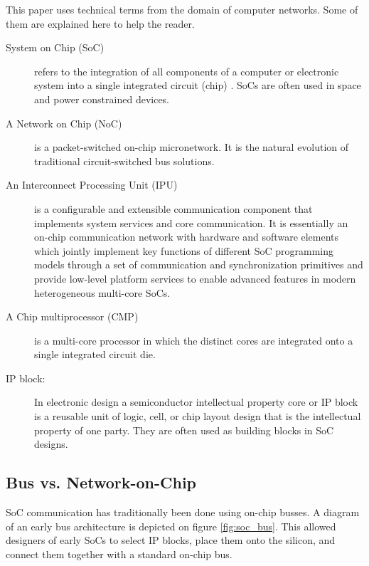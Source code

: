 This paper uses technical terms from the domain of computer networks. 
Some of them are explained here to help the reader.

\begin{description}

\item[System on Chip (SoC)] 
	
refers to the integration of all components of a computer or electronic system into a single integrated circuit (chip) \cite{wikiSoC}. SoCs are often used in space and power constrained devices.
	
\item[A Network on Chip (NoC)] 

is a packet-switched on-chip micronetwork. 
It is the natural evolution of traditional circuit-switched bus solutions. 
	
\item[An Interconnect Processing Unit (IPU)] 
	
is a configurable and extensible communication component that implements system services and core communication. 
It is essentially an on-chip communication network with hardware and software elements which jointly implement key functions of different SoC programming models through a set of communication and synchronization primitives and provide low-level platform services to enable advanced features in modern heterogeneous multi-core SoCs.\cite{coppola2008design}

\item[A Chip multiprocessor (CMP)] 

is a multi-core processor in which the distinct cores are integrated onto a single integrated circuit die.

\item[IP block:] 
	
In electronic design a semiconductor intellectual property core or IP block is a reusable unit of logic, cell, or chip layout design that is the intellectual property of one party. 
They are often used as building blocks in SoC designs.

\end{description}

\subsection{Bus vs. Network-on-Chip}\label{S:busvsnoc}

SoC communication has traditionally been done using on-chip busses. 
A diagram of an early bus architecture is depicted on figure \ref{fig:soc_bus}. 
This allowed designers of early SoCs to select IP blocks, place them onto the silicon, and connect them together with a standard on-chip bus.

